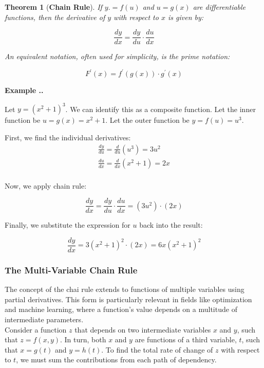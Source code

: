 \documentclass{article}
\theoremstyle{plain}
\newtheorem{myth}{Theorem}[section]
\theoremstyle{definition}
\theoremstyle{remark}
\newcounter{myex}[myth]
\renewcommand{\themyex}{\themyth.\arabic{myex}}
\newenvironment{myex}[1][]{
  \refstepcounter{myex}%
  \par\medskip
  \noindent\textbf{Example \themyex.} #1\par
  \noindent
}{\medskip}
\begin{document}
  \begin{myth}[\textbf{Chain Rule}]
    \label{Chain Rule}
    If $y. = f(u)$ and $u = g(x)$ are differentiable functions, then the
    derivative of $y$ with respect to $x$ is given by:

              \[\frac{dy}{dx} = \frac{dy}{du} \cdot \frac{du}{dx}\]

    An equivalent notation, often used for simplicity, is the prime notation:

              \[F^\prime(x) = f^\prime(g(x)) \cdot g^\prime(x)\]
  \end{myth}
  \medskip
  \begin{myex}
    Let $y=(x^2 + 1)^3$. We can identify this as a composite function.
    Let the inner function be $u = g(x) = x^2 + 1$.
    Let the outer function be $y= f(u) = u^3$.

    First, we find the individual derivatives:
    \begin{gather*}
        \frac{dy}{du} = \frac{d}{du}(u^3) = 3u^2\\
        \frac{du}{dx} = \frac{d}{dx}(x^2 + 1) = 2x\\
    \end{gather*}

    Now, we apply chain rule:

              \[\frac{dy}{dx} = \frac{dy}{du} \cdot \frac{du}{dx} = (3u^2) \cdot (2x)\]

    Finally, we substitute the expression for $u$ back into the result:

              \[\frac{dy}{dx} = 3(x^2 + 1)^2 \cdot (2x) = 6x(x^2 + 1)^2\]
  \end{myex}

  \subsubsection{The Multi-Variable Chain Rule}
  \noindent The concept of the chai rule extends to functions of multiple
variables using partial derivatives. This form is particularly relevant in
fields like optimization and machine learning, where a function's value
depends on a multitude of intermediate parameters.\\

  \noindent Consider a function $z$ that depends on two intermediate
variables $x$ and $y$, such that $z = f(x,y)$. In turn, both $x$ and $y$ are
functions of a third variable, $t$, such that $x = g(t)$ and $y = h(t)$. To
find the total rate of change of $z$ with respect to $t$, we must sum the
contributions from each path of dependency.\\
\end{document}
